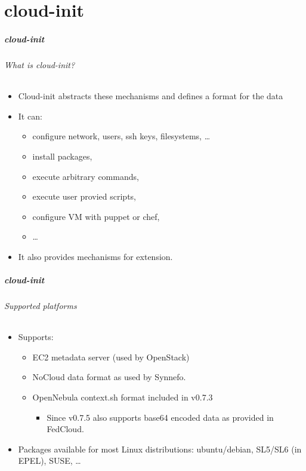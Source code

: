 \part{cloud-init}


\begin{frame}
  \frametitle{cloud-init}
  \framesubtitle{What is cloud-init?}
    \begin{itemize}
      \item Cloud-init abstracts these mechanisms and defines a format for the data
      \item It can:
      \begin{itemize}
        \item configure network, users, ssh keys, filesystems, \dots
        \item install packages,
        \item execute arbitrary commands,
        \item execute user provied scripts,
        \item configure VM with puppet or chef,
        \item \dots
      \end{itemize}
      \item It also provides mechanisms for extension.
    \end{itemize}
\end{frame}


\begin{frame}
  \frametitle{cloud-init}
  \framesubtitle{Supported platforms}

  \begin{itemize}
    \item Supports:
    \begin{itemize}
       \item EC2 metadata server (used by OpenStack)
       \item NoCloud data format as used by Synnefo.
       \item OpenNebula context.sh format included in v0.7.3
        \begin{itemize}
          \item Since v0.7.5 also supports base64 encoded data as provided in FedCloud.
        \end{itemize}
    \end{itemize}
    \item Packages available for most Linux distributions: ubuntu/debian, SL5/SL6 (in EPEL), SUSE, \dots
    \end{itemize}
\end{frame}

